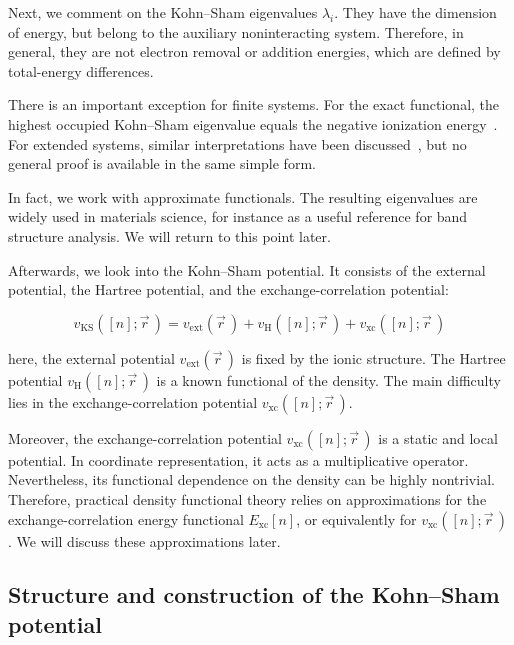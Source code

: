 Next, we comment on the Kohn--Sham eigenvalues $\lambda_i$.
They have the dimension of energy,
but belong to the auxiliary noninteracting system.
Therefore, in general, they are not electron removal or addition energies,
which are defined by total-energy differences.

There is an important exception for finite systems.
For the exact functional, the highest occupied Kohn--Sham eigenvalue equals the negative ionization energy~\cite{perdew1997comment, harbola1999relationship}.
For extended systems, similar interpretations have been discussed~\cite{mundt2006photoelectron},
but no general proof is available in the same simple form.

In fact, we work with approximate functionals.
The resulting eigenvalues are widely used in materials science, for instance as a useful reference for band structure analysis.
We will return to this point later.

Afterwards, we look into the Kohn--Sham potential.
It consists of the external potential, the Hartree potential, and the exchange-correlation potential:

\begin{equation}
    v_\mathrm{KS}([n];\vec{r}\,)
    = v_\mathrm{ext}(\vec{r}\,)
    + v_\mathrm{H}([n];\vec{r}\,)
    + v_\mathrm{xc}([n];\vec{r}\,)
\label{KS_potential_decomposition}
\end{equation}

here, the external potential $v_\mathrm{ext}(\vec{r}\,)$ is fixed by the ionic structure.
The Hartree potential $v_\mathrm{H}([n];\vec{r}\,)$ is a known functional of the density.
The main difficulty lies in the exchange-correlation potential $v_\mathrm{xc}([n];\vec{r}\,)$.

Moreover, the exchange-correlation potential $v_\mathrm{xc}([n];\vec{r}\,)$ is a static and local potential.
In coordinate representation, it acts as a multiplicative operator.
Nevertheless, its functional dependence on the density can be highly nontrivial.
Therefore, practical density functional theory relies on approximations for the exchange-correlation energy functional $E_\mathrm{xc}[n]$,
or equivalently for $v_\mathrm{xc}([n];\vec{r}\,)$.
We will discuss these approximations later.

\subsection{Structure and construction of the Kohn--Sham potential}

